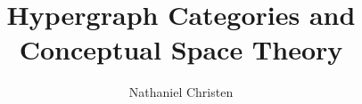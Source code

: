 \documentclass[11pt,twocolumn]{article}
\begin{document}
\title{Hypergraph Categories and Conceptual Space Theory}
\author[1]{Nathaniel Christen}
\maketitle{}






\end{document}
